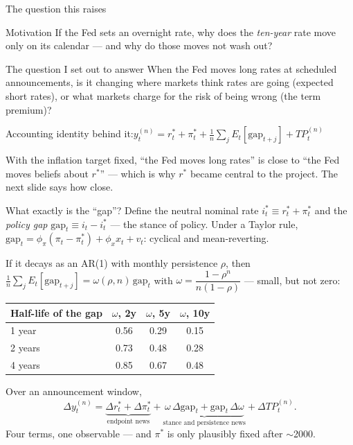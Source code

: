 \documentclass[11pt,aspectratio=169]{beamer}
\newcommand{\tk}[1]{{\color{ink2}\footnotesize #1}}
\newcommand{\rs}{$r^{*}$}
\begin{document}
\begin{frame}{The question this raises}
\begin{block}{Motivation}
If the Fed sets an overnight rate, why does the \emph{ten-year} rate move only on its calendar --- and why do those moves not wash out?
\end{block}
\vspace{0.3em}
\begin{block}{The question I set out to answer}
When the Fed moves long rates at scheduled announcements, is it changing \alert{where markets think rates are going} (expected short rates), or \alert{what markets charge for the risk of being wrong} (the term premium)?
\end{block}
\vspace{0.3em}
\tk{Accounting identity behind it:\quad $y^{(n)}_t = r^{*}_t + \pi^{*}_t + \tfrac1n\sum_j E_t[\text{gap}_{t+j}] + TP^{(n)}_t$}
\vspace{0.2em}

\tk{With the inflation target fixed, ``the Fed moves long rates'' is close to ``the Fed moves beliefs about \rs{}'' --- which is why \rs{} became central to the project. The next slide says how close.}
\end{frame}

\begin{frame}{What exactly is the ``gap''?}
\small
Define the neutral nominal rate $i^{*}_t\equiv r^{*}_t+\pi^{*}_t$ and the \emph{policy gap}
$\text{gap}_t\equiv i_t-i^{*}_t$ --- the stance of policy. Under a Taylor rule,
$\text{gap}_t=\phi_\pi(\pi_t-\pi^{*}_t)+\phi_x x_t+v_t$: cyclical and mean-reverting.
\vspace{0.2em}

If it decays as an AR(1) with monthly persistence $\rho$, then
$\frac1n\sum_j E_t[\text{gap}_{t+j}]=\omega(\rho,n)\,\text{gap}_t$ with
$\omega=\dfrac{1-\rho^{n}}{n(1-\rho)}$ --- \alert{small, but not zero}:
\vspace{-0.2em}
\begin{center}\footnotesize
\begin{tabular}{lccc}
\toprule
Half-life of the gap & $\omega$, 2y & $\omega$, 5y & $\omega$, 10y\\ \midrule
1 year & 0.56 & 0.29 & 0.15\\
2 years & 0.73 & 0.48 & 0.28\\
4 years & 0.85 & 0.67 & 0.48\\
\bottomrule\end{tabular}
\end{center}
\vspace{-0.4em}
\footnotesize
Over an announcement window,
\vspace{-0.6em}
\[
\Delta y^{(n)}_t=\underbrace{\Delta r^{*}_t+\Delta\pi^{*}_t}_{\text{endpoint news}}
+\underbrace{\omega\,\Delta\text{gap}_t+\text{gap}_t\,\Delta\omega}_{\text{stance and persistence news}}
+\Delta TP^{(n)}_t .
\]
\vspace{-0.5em}
\alert{Four terms, one observable} --- and $\pi^{*}$ is only plausibly fixed after $\sim$2000.
\end{frame}
\end{document}
